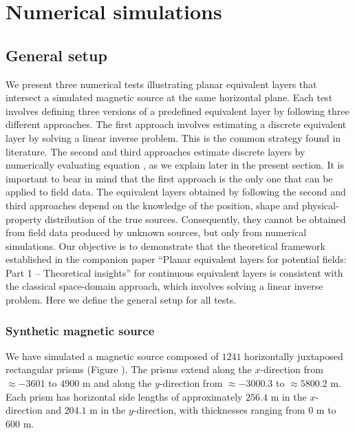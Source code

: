 \section{Numerical simulations}
\label{eq:numerical_simulations}

\subsection{General setup}

We present three numerical tests illustrating planar equivalent layers that intersect a simulated 
magnetic source at the same horizontal plane.
Each test involves defining three versions of a predefined equivalent layer by following three different approaches.
The first approach involves estimating a discrete equivalent layer by solving a linear inverse problem. 
This is the common strategy found in literature.
The second and third approaches estimate discrete layers by numerically evaluating equation , 
as we explain later in the present section. 
It is important to bear in mind that the first approach is the only one that can be applied to field data.
The equivalent layers obtained by following the second and third approaches depend on the knowledge of
the position, shape and physical-property distribution of the true sources. Consequently, they cannot be 
obtained from field data produced by unknown sources, but only from numerical simulations.
Our objective is to demonstrate that the theoretical framework established in the companion paper
``Planar equivalent layers for potential fields: Part 1 -- Theoretical insights'' 
for continuous equivalent layers is consistent with the classical space-domain approach, which involves solving a linear inverse problem.
Here we define the general setup for all tests.

\subsubsection{Synthetic magnetic source}

We have simulated a magnetic source composed of $1241$ horizontally juxtaposed rectangular prisms
(Figure ). 
The prisms extend along the $x$-direction from $\approx -3601$ to $4900$ m and 
along the $y$-direction from $\approx -3000.3$ to $\approx 5800.2$ m. 
Each prism has horizontal side lengths of approximately $256.4$ m in the $x$-direction 
and $204.1$ m in the $y$-direction, with thicknesses ranging from $0$ m to $600$ m. 

